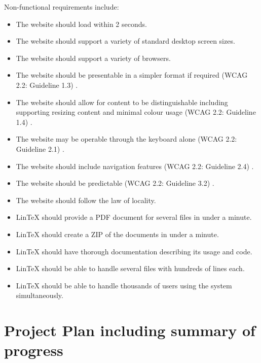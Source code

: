 \documentclass[11pt,titlepage,dvipsnames,table,xcdraw]{article}
\begin{document}
Non-functional requirements include:
\begin{itemize}
\item The website should load within 2 seconds.
\item The website should support a variety of standard desktop screen sizes.
\item The website should support a variety of browsers.
\item The website should be presentable in a simpler format if required (WCAG 2.2: Guideline 1.3) \cite{wcag}.
\item The website should allow for content to be distinguishable including supporting resizing content and minimal colour usage (WCAG 2.2: Guideline 1.4) \cite{wcag}.
\item The website may be operable through the keyboard alone (WCAG 2.2: Guideline 2.1) \cite{wcag}.
\item The website should include navigation features (WCAG 2.2: Guideline 2.4) \cite{wcag}.
\item The website should be predictable (WCAG 2.2: Guideline 3.2) \cite{wcag}.
\item The website should follow the law of locality.
\item LinTeX should provide a PDF document for several files in under a minute.
\item LinTeX should create a ZIP of the documents in under a minute.
\item LinTeX should have thorough documentation describing its usage and code.
\item LinTeX should be able to handle several files with hundreds of lines each.
\item LinTeX should be able to handle thousands of users using the system simultaneously.
\end{itemize}
\clearpage

\section{Project Plan including summary of progress}


\end{document}
